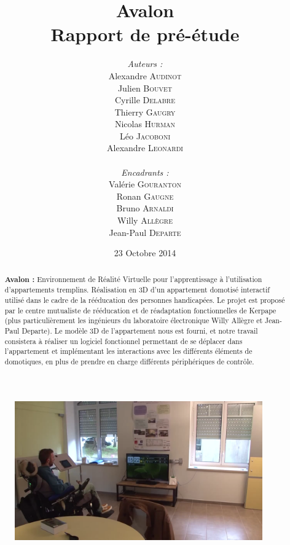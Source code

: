 \documentclass[a4paper,11pt]{article}
\title{
  \textbf{Avalon}\\
  Rapport de pré-étude
}
\author{
\begin{minipage}{0.4\textwidth}
	\begin{flushleft} \large
		\emph{Auteurs :}\\
		Alexandre \textsc{Audinot}\\
		Julien \textsc{Bouvet}\\
		Cyrille \textsc{Delabre}\\
		Thierry \textsc{Gaugry}\\
		Nicolas \textsc{Hurman}\\
		Léo \textsc{Jacoboni}\\
		Alexandre \textsc{Leonardi}\\
	\end{flushleft}
\end{minipage}
\begin{minipage}{0.4\textwidth}
	\begin{flushright} \large
		\emph{Encadrants :} \\
		Valérie \textsc{Gouranton}\\
		Ronan \textsc{Gaugne}\\
		Bruno \textsc{Arnaldi}\\
		Willy \textsc{Allègre}\\
		Jean-Paul  \textsc{Departe}\\
	\end{flushright}
\end{minipage}
}
\date{23 Octobre 2014}
\begin{document}
\maketitle
\thispagestyle{empty}
\begin{abstract}
\textbf{Avalon :} Environnement de Réalité Virtuelle pour l'apprentissage à l'utilisation d'appartements tremplins. Réalisation en 3D d'un appartement domotisé interactif utilisé dans le cadre de la rééducation des personnes handicapées.
Le projet est proposé par le centre mutualiste de rééducation et de réadaptation fonctionnelles de Kerpape (plus particulièrement les ingénieurs du laboratoire électronique Willy Allègre et Jean-Paul Departe).
Le modèle 3D de l'appartement nous est fourni, et notre travail consistera à réaliser un logiciel fonctionnel permettant de se déplacer dans l'appartement et implémentant les interactions avec les différents éléments de domotiques, en plus de prendre en charge différents périphériques de contrôle. 
\end{abstract}

\begin{figure}[h!]
	\centering
	\includegraphics[height=170pt]{1-PreEtude/img/screen_appart.png}
\end{figure}
\end{document}
